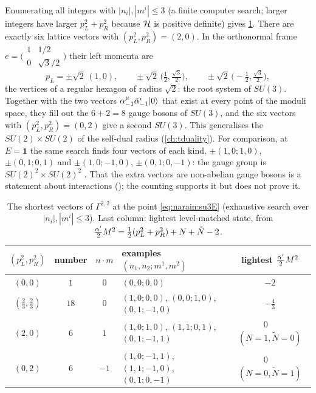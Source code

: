 \begin{example}
Enumerating all integers with $|n_i|,|m^i|\le3$ (a finite computer search; larger integers
have larger $p_L^2+p_R^2$ because $\mathcal{H}$ is positive definite) gives \cref{tab:narain:su3}.
There are exactly six lattice vectors with $(p_L^2,p_R^2)=(2,0)$. In the orthonormal frame
$e=\big(\begin{smallmatrix}1&1/2\\0&\sqrt3/2\end{smallmatrix}\big)$ their left momenta are
\[
 p_L=\pm\sqrt2\,(1,0),\qquad\pm\sqrt2\,\big(\tfrac12,\tfrac{\sqrt3}2\big),\qquad
 \pm\sqrt2\,\big(-\tfrac12,\tfrac{\sqrt3}2\big),
\]
the vertices of a regular hexagon of radius $\sqrt2$: the root system of $SU(3)$. Together
with the two vectors $\alpha^\mu_{-1}\tilde\alpha^i_{-1}|0\rangle$ that exist at every point of
the moduli space, they fill out the $6+2=8$ gauge bosons of $SU(3)$, and the six vectors with
$(p_L^2,p_R^2)=(0,2)$ give a second $SU(3)$. This generalises the $SU(2)\times SU(2)$ of the
self-dual radius (\cref{ch:tduality}). For comparison, at $E=\mathbf 1$ the same search finds
four vectors of each kind, $\pm(1,0;1,0)$, $\pm(0,1;0,1)$ and $\pm(1,0;-1,0)$,
$\pm(0,1;0,-1)$: the gauge group is $SU(2)^2\times SU(2)^2$
. That the extra vectors are non-abelian gauge bosons
is a statement about interactions (\TL); the counting supports it but does not prove it.
\end{example}

\begin{table}[t]
\centering
\caption{The shortest vectors of $\Gamma^{2,2}$ at the point \eqref{eq:narain:su3E}
(exhaustive search over $|n_i|,|m^i|\le3$). Last column: lightest level-matched state, from
$\frac{\alpha'}2M^2=\frac12(p_L^2+p_R^2)+N+\tilde N-2$.}
\label{tab:narain:su3}
\begin{tabular}{@{}cccp{}c@{}}\toprule
$(p_L^2,p_R^2)$ & number & $n\cdot m$ & examples $(n_1,n_2;m^1,m^2)$ & lightest
$\frac{\alpha'}2M^2$\\\midrule
$(0,0)$ & $1$ & $0$ & $(0,0;0,0)$ & $-2$\\
$(\frac23,\frac23)$ & $18$ & $0$ & $(1,0;0,0)$, $(0,0;1,0)$, $(0,1;-1,0)$ & $-\frac43$\\
$(2,0)$ & $6$ & $1$ & $(1,0;1,0)$, $(1,1;0,1)$, $(0,1;-1,1)$ & $0$\ \ $(N=1,\tilde N=0)$\\
$(0,2)$ & $6$ & $-1$ & $(1,0;-1,1)$, $(1,1;-1,0)$, $(0,1;0,-1)$ & $0$\ \ $(N=0,\tilde N=1)$\\
\bottomrule
\end{tabular}
\end{table}


